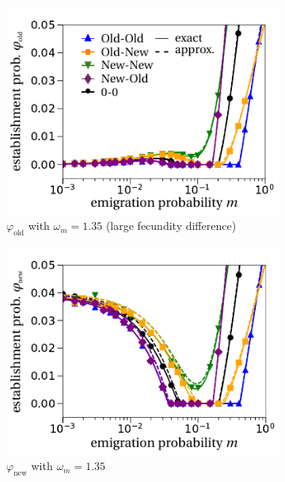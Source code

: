 \documentclass[a4paper,11pt]{article}
\begin{document}
\begin{figure}[t!]
	\centering
	\begin{subfigure}{.5\textwidth}
  		\centering
  		\includegraphics[width=\linewidth]{fig2a.pdf}
  		\caption{$\varphi_{\text{old}}$ with $\omega_m = 1.35$ (large fecundity difference)}
	\end{subfigure}%
	\begin{subfigure}{.5\textwidth}
 		 \centering
 		 \includegraphics[width=\linewidth]{fig2b.pdf}
  		\caption{$\varphi_{\text{new}}$ with $\omega_m = 1.35$}
	\end{subfigure}
	\begin{subfigure}{.5\textwidth}
  		\centering

\end{subfigure}
\end{figure}
\end{document}
